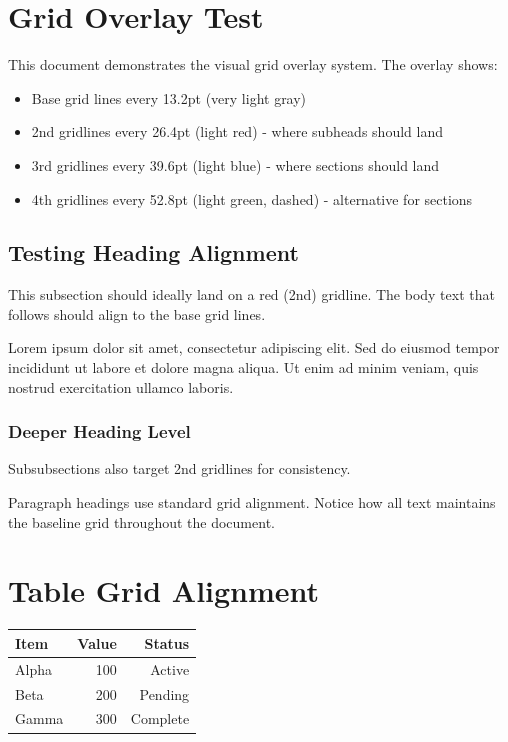 \documentclass[11pt]{article}
\begin{document}
\section{Grid Overlay Test}

This document demonstrates the visual grid overlay system. The overlay shows:
\begin{itemize}
\item Base grid lines every 13.2pt (very light gray)
\item 2nd gridlines every 26.4pt (light red) - where subheads should land
\item 3rd gridlines every 39.6pt (light blue) - where sections should land
\item 4th gridlines every 52.8pt (light green, dashed) - alternative for sections
\end{itemize}

\subsection{Testing Heading Alignment}

This subsection should ideally land on a red (2nd) gridline. The body text that follows should align to the base grid lines.

Lorem ipsum dolor sit amet, consectetur adipiscing elit. Sed do eiusmod tempor incididunt ut labore et dolore magna aliqua. Ut enim ad minim veniam, quis nostrud exercitation ullamco laboris.

\subsubsection{Deeper Heading Level}

Subsubsections also target 2nd gridlines for consistency.

Paragraph headings use standard grid alignment. Notice how all text maintains the baseline grid throughout the document.

\section{Table Grid Alignment}

\begin{gridtable}
  \caption{Grid-Aligned Table}
  \centering
  \begin{tabular}{@{}lrr@{}}
    \toprule
    Item & Value & Status \\
    \midrule
    Alpha & 100 & Active \\
    Beta & 200 & Pending \\
    Gamma & 300 & Complete \\
    \bottomrule
  \end{tabular}
\end{gridtable}
\end{document}
